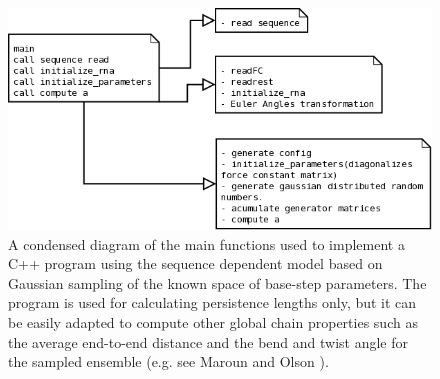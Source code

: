 \begin{figure}
\centering
\includegraphics[angle=0, scale=0.5]{Appendix/generalschema.png}
\caption{A condensed diagram of the main functions used to implement a
  C++  program using the  sequence dependent  model based  on Gaussian
  sampling of the known space  of base-step parameters. The program is
  used for calculating persistence lengths only, but it can be easily
  adapted  to compute  other  global chain  properties  such as  the
  average end-to-end  distance and  the bend and  twist angle  for the
  sampled ensemble (e.g. see Maroun and Olson \cite{maroun1988b}).}
\label{fig:sketch}
\end{figure}  














